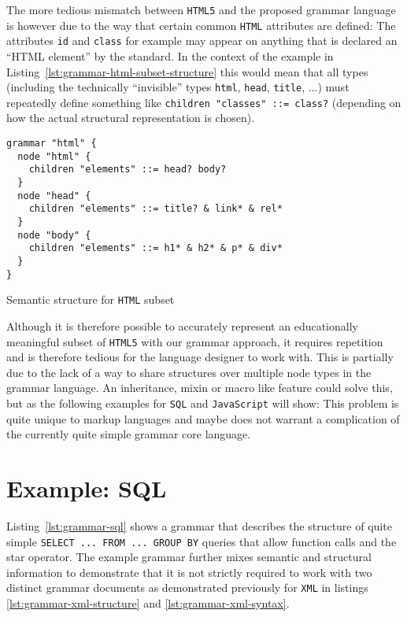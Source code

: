 \documentclass[sigconf,natbib=false,review=true,anonymous]{acmart}
\begin{document}
The more tedious mismatch between \texttt{HTML5} and the proposed grammar language is however due to the way that certain common \texttt{HTML} attributes are defined: The attributes \texttt{id} and \texttt{class} for example may appear on anything that is declared an \enquote{HTML element} by the standard. In the context of the example in Listing~\ref{lst:grammar-html-subset-structure} this would mean that all types (including the technically \enquote{invisible} types \texttt{html}, \texttt{head}, \texttt{title}, ...) must repeatedly define something like \texttt{children "classes" ::= class?} (depending on how the actual structural representation is chosen).

\begin{listing}[H]
\begin{verbatim}
grammar "html" {
  node "html" {
    children "elements" ::= head? body?
  }
  node "head" {
    children "elements" ::= title? & link* & rel*
  }
  node "body" {
    children "elements" ::= h1* & h2* & p* & div*
  }
}
\end{verbatim}
\caption{Semantic structure for \texttt{HTML} subset}
\label{lst:grammar-html-subset-structure}
\end{listing}

Although it is therefore possible to accurately represent an educationally meaningful subset of \texttt{HTML5} with our grammar approach, it requires repetition and is therefore tedious for the language designer to work with. This is partially due to the lack of a way to share structures over multiple node types in the grammar language. An inheritance, mixin or macro like feature could solve this, but as the following examples for \texttt{SQL} and \texttt{JavaScript} will show: This problem is quite unique to markup languages and maybe does not warrant a complication of the currently quite simple grammar core language.

\section{Example: SQL}

Listing~\ref{lst:grammar-sql} shows a grammar that describes the structure of quite simple \texttt{SELECT ... FROM ... GROUP BY} queries that allow function calls and the star operator. The example grammar further mixes semantic and structural information to demonstrate that it is not strictly required to work with two distinct grammar documents as demonstrated previously for \texttt{XML} in listings \ref{lst:grammar-xml-structure} and \ref{lst:grammar-xml-syntax}.
\end{document}
